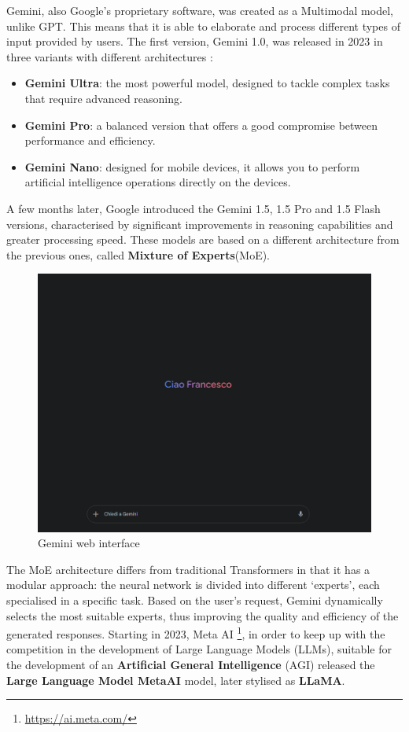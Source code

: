 Gemini, also Google's proprietary software, was created as a Multimodal model, unlike GPT. This means that it is able to elaborate and process different types of input provided by users. The first version, Gemini 1.0, was released in 2023 in three variants with different architectures \cite{Gemini}: \\
\begin{itemize}
    \item \textbf{Gemini Ultra}: the most powerful model, designed to tackle complex tasks that require advanced reasoning.
    \item  \textbf{Gemini Pro}: a balanced version that offers a good compromise between performance and efficiency.
    \item \textbf{Gemini Nano}: designed for mobile devices, it allows you to perform artificial intelligence operations directly on the devices.
\end{itemize}
A few months later, Google introduced the Gemini 1.5, 1.5 Pro and 1.5 Flash versions, characterised by significant improvements in reasoning capabilities and greater processing speed. These models are based on a different architecture from the previous ones, called \textbf{Mixture of Experts}(MoE)\cite{MoE}.
\begin{figure}[h]
    \centering
    \includegraphics[width=0.7\linewidth]{Figures/Gemini.png}
    \caption{Gemini web interface}
    \label{fig:graph}
\end{figure}
The MoE architecture differs from traditional Transformers in that it has a modular approach: the neural network is divided into different ‘experts’, each specialised in a specific task. Based on the user's request, Gemini dynamically selects the most suitable experts, thus improving the quality and efficiency of the generated responses.
Starting in 2023, Meta AI \footnote{\url{https://ai.meta.com/}}, in order to keep up with the competition in the development of Large Language Models (LLMs), suitable for the development of an \textbf{Artificial General Intelligence} (AGI)\cite{AGI}  released the \textbf{Large Language Model MetaAI} model, later stylised as \textbf{LLaMA}.
